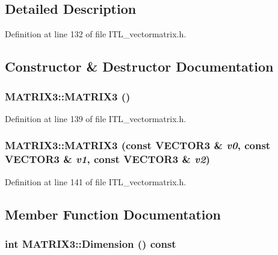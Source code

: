 \subsection{Detailed Description}


Definition at line 132 of file ITL\_\-vectormatrix.h.



\subsection{Constructor \& Destructor Documentation}
\hypertarget{classMATRIX3_a6c4e88b8dc71944f2819d809c8af33db}{
\subsubsection[{MATRIX3}]{\setlength{\rightskip}{0pt plus 5cm}MATRIX3::MATRIX3 ()}}
\label{classMATRIX3_a6c4e88b8dc71944f2819d809c8af33db}


Definition at line 139 of file ITL\_\-vectormatrix.h.

\hypertarget{classMATRIX3_ae537368e20b379c611c2897396ca879b}{
\subsubsection[{MATRIX3}]{\setlength{\rightskip}{0pt plus 5cm}MATRIX3::MATRIX3 (const {\bf VECTOR3} \& {\em v0}, \/  const {\bf VECTOR3} \& {\em v1}, \/  const {\bf VECTOR3} \& {\em v2})}}
\label{classMATRIX3_ae537368e20b379c611c2897396ca879b}


Definition at line 141 of file ITL\_\-vectormatrix.h.



\subsection{Member Function Documentation}
\hypertarget{classMATRIX3_ad39ac7b76a15a678c8a74dc8a95e0754}{
\subsubsection[{Dimension}]{\setlength{\rightskip}{0pt plus 5cm}int MATRIX3::Dimension () const}}
\label{classMATRIX3_ad39ac7b76a15a678c8a74dc8a95e0754}


